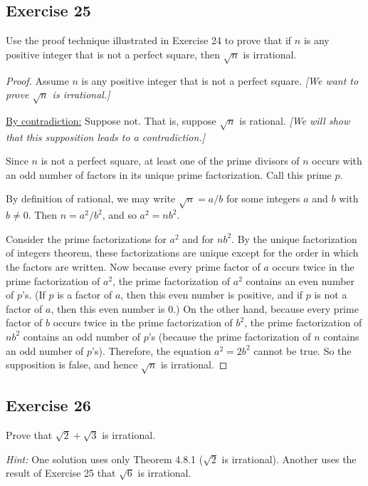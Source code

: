 \documentclass[14pt]{extarticle}
\begin{document}
\subsection{Exercise 25}
Use the proof technique illustrated in Exercise 24 to prove that if $n$ is any positive integer that is not a perfect square, then $\sqrt{n}$ is irrational.

\begin{proof}
    Assume $n$ is any positive integer that is not a perfect square. {\it [We want to prove $\sqrt{n}$ is irrational.]}

    \underline{By contradiction:} Suppose not. That is, suppose
    $\sqrt{n}$ is rational. {\it [We will show that this supposition leads to a contradiction.]}

    Since $n$ is not a perfect square, at least one of the prime divisors of $n$ occurs with an odd number of factors in its unique prime factorization. Call this prime $p$.

    By definition of rational, we may write $\sqrt{n} = a/b$ for some integers $a$ and $b$ with $b \neq 0$. Then $n = a^2/b^2$, and so $a^2 = nb^2$.

    Consider the prime factorizations for $a^2$ and for $nb^2$. By the unique factorization of integers theorem, these factorizations are unique except for the order in which the factors are written. Now because every prime factor of $a$ occurs twice in the prime factorization of $a^2$, the prime factorization of $a^2$ contains an even number of $p$’s. (If $p$ is a factor of $a$, then this even number is positive, and if $p$ is not a factor of $a$, then this even number is 0.) On the other hand, because every prime factor of $b$ occurs twice in the prime factorization of $b^2$, the prime factorization of $nb^2$ contains an odd number of $p$’s (because the prime factorization of $n$ contains an odd number of $p$'s). Therefore, the equation $a^2 = 2b^2$ cannot be true. So the supposition is false, and hence $\sqrt{n}$ is irrational.
\end{proof}

\subsection{Exercise 26}
Prove that $\sqrt{2} + \sqrt{3}$ is irrational.

    {\it Hint:} One solution uses only Theorem 4.8.1 ($\sqrt{2}$ is irrational). Another uses the result of Exercise 25 that $\sqrt{6}$ is irrational.
\end{document}
